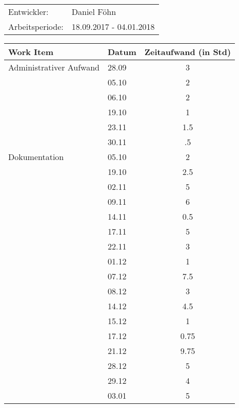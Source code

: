 \newcommand{\header}{\textbf{Work Item}&\textbf{Datum}&\textbf{Zeitaufwand (in Std)}\\\toprule}
\newcommand{\footer}{\midrule\textbf{Total Arbeitsstunden}&-&\textbf{154.75}\\\midrule\bottomrule}
\begin{tabular}{ll}
    Entwickler: & Daniel Föhn \\
    Arbeitsperiode: & 18.09.2017 - 04.01.2018\\
\end{tabular}
\begin{longtable}{p{9cm}|p{2cm}|c}
    \header

    Administrativer Aufwand & 28.09 & 3\\
    & 05.10 & 2\\
    & 06.10 & 2\\
    & 19.10 & 1\\
    & 23.11 & 1.5\\
    & 30.11 & .5\\
    
    Dokumentation & 05.10 & 2\\
    & 19.10 & 2.5\\
    & 02.11 & 5\\
    & 09.11 & 6\\
    & 14.11 & 0.5\\
    & 17.11 & 5\\
    & 22.11 & 3\\
    & 01.12 & 1\\
    & 07.12 & 7.5\\
    & 08.12 & 3\\
    & 14.12 & 4.5\\
    & 15.12 & 1\\
    & 17.12 & 0.75\\
    & 21.12 & 9.75\\
    & 28.12 & 5\\
    & 29.12 & 4\\
    & 03.01 & 5\\
    

\end{longtable}
